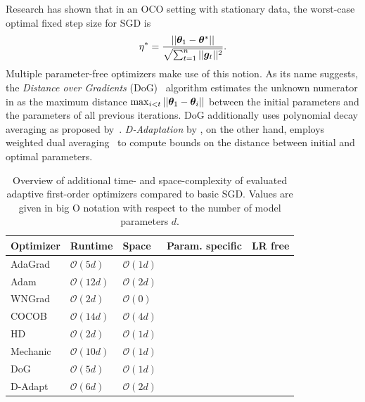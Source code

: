 \documentclass{article} %
\newcommand{\cmark}{\ding{51}} %
\newcommand{\xmark}{\ding{55}} %
\begin{document}
Research has shown that in an OCO setting with stationary data, the worst-case optimal fixed step size for SGD is
\begin{equation}\label{eq:oco_optimal_lr}
   \eta^* = \frac{||{\bm{\theta}}_1 - {\bm{\theta}}^*||}{\sqrt{\sum_{t=1}^{n} ||{\bm{g}}_t||^2}}.
\end{equation}
Multiple parameter-free optimizers make use of this notion.
As its name suggests, the \textit{Distance over Gradients} (DoG)~\citep{ivgiDoGSGDBest2023} algorithm estimates the unknown numerator in  as the maximum distance $\max_{i<t}||{\bm{\theta}}_1 - {\bm{\theta}}_i||$ between the initial parameters and the parameters of all previous iterations.
DoG additionally uses polynomial decay averaging as proposed by~\citet{shamirStochasticGradientDescent2012}.
\textit{D-Adaptation} by \citet{defazioLearningRateFreeLearningDAdaptation2023a}, on the other hand, employs weighted dual averaging~\citep{duchiDualAveragingDistributed2012} to compute bounds on the distance between initial and optimal parameters.

\begin{table}[hb]
   \centering
   \small
   \caption{
      Overview of additional time- and space-complexity of evaluated adaptive first-order optimizers compared to basic SGD.
      Values are given in big O notation with respect to the number of model parameters $d$.
   }\label{tab:param_free_optims}
   \begin{tabular}{@{}lllcc@{}}
      \toprule
      Optimizer                & Runtime            & Space             & Param. specific & LR free \\ \midrule
      AdaGrad                  & $\mathcal{O}(5d)$  & $\mathcal{O}(1d)$ & \cmark          & \xmark  \\
      Adam                     & $\mathcal{O}(12d)$ & $\mathcal{O}(2d)$ & \cmark          & \xmark  \\
      WNGrad                   & $\mathcal{O}(2d)$  & $\mathcal{O}(0)$  & \xmark          & \xmark  \\
      COCOB                    & $\mathcal{O}(14d)$ & $\mathcal{O}(4d)$ & \cmark          & \cmark  \\
      HD\footnotemark[2]       & $\mathcal{O}(2d)$  & $\mathcal{O}(1d)$ & \xmark          & \xmark  \\
      Mechanic\footnotemark[2] & $\mathcal{O}(10d)$ & $\mathcal{O}(1d)$ & \cmark          & \cmark  \\
      DoG                      & $\mathcal{O}(5d)$  & $\mathcal{O}(1d)$ & \xmark          & \cmark  \\
      D-Adapt\footnotemark[2]  & $\mathcal{O}(6d)$  & $\mathcal{O}(2d)$ & \xmark          & \cmark  \\
      \bottomrule
   \end{tabular}
\end{table}
\end{document}
